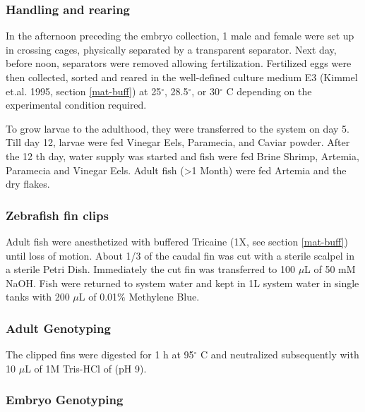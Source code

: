 \documentclass[11pt,singlespacinge,twoside]{reedthesis} %
\theoremstyle{definition}
\theoremstyle{definition}
\theoremstyle{definition}
\theoremstyle{remark}
\begin{document}
\hypertarget{handling-and-rearing}{%
\subsubsection{Handling and rearing}\label{handling-and-rearing}}

In the afternoon preceding the embryo collection, 1 male and female were set up in crossing cages, physically separated by a transparent separator. Next day, before noon, separators were removed allowing fertilization. Fertilized eggs were then collected, sorted and reared in the well-defined culture medium E3 (Kimmel et.al. 1995, section \ref{mat-buff}) at 25\(^\circ\), 28.5\(^\circ\), or 30\(^\circ\) C depending on the experimental condition required.

To grow larvae to the adulthood, they were transferred to the system on day 5. Till day 12, larvae were fed Vinegar Eels, Paramecia, and Caviar powder. After the 12 th day, water supply was started and fish were fed Brine Shrimp, Artemia, Paramecia and Vinegar Eels. Adult fish (\textgreater1 Month) were fed Artemia and the dry flakes.

\hypertarget{zebrafish-fin-clips}{%
\subsubsection{Zebrafish fin clips}\label{zebrafish-fin-clips}}

Adult fish were anesthetized with buffered Tricaine (1X, see section \ref{mat-buff}) until loss of motion. About 1/3 of the caudal fin was cut with a sterile scalpel in a sterile Petri Dish. Immediately the cut fin was transferred to 100 \(\mu\)L of 50 mM NaOH. Fish were returned to system water and kept in 1L system water in single tanks with 200 \(\mu\)L of 0.01\(\%\) Methylene Blue.

\hypertarget{adult-genotyping}{%
\subsubsection{Adult Genotyping}\label{adult-genotyping}}

The clipped fins were digested for 1 h at 95\(^\circ\) C and neutralized subsequently with 10 \(\mu\)L of 1M Tris-HCl of (pH 9).

\hypertarget{embryo-genotyping}{%
\subsubsection{Embryo Genotyping}\label{embryo-genotyping}}
\end{document}
